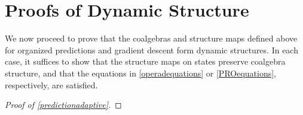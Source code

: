 \documentclass[11pt, one side, article]{memoir}
\theoremstyle{definition}
\theoremstyle{plain}
\newcommand{\0}{\textsf{0}}
\newcommand{\1}{\tn{\textsf{1}}}
\begin{document}
\chapter{Proofs of Dynamic Structure}\label{proofs}


We now proceed to prove that the coalgebras and structure maps defined above for organized predictions and gradient descent form dynamic structures. In each case, it suffices to show that the structure maps on states preserve coalgebra structure, and that the equations in \cref{operadequations} or \cref{PROequations}, respectively, are satisfied.

\begin{proof}[Proof of \cref{predictionadaptive}]

\end{proof}
\end{document}
